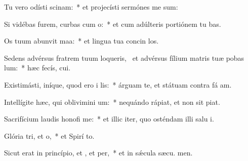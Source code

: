 \item Tu vero odísti scinam:~* et projecísti sermónes me sum:
\item Si vidébas furem, curbas cum o:~* et cum adúlteris portiónem tu bas.
\item Os tuum abunvit maa:~* et lingua tua concin los.
\item Sedens advérsus fratrem tuum loqueris,~\pscross{} et advérsus fílium matris tuæ pobas lum:~* hæc fecís,  cui.
\item Existimásti, iníque, quod ero i lis:~* árguam te, et státuam contra fá am.
\item Intellígite hæc, qui oblivimini um:~* nequándo rápiat, et non sit  piat.
\item Sacrifícium laudis honofi me:~* et illic iter, quo osténdam illi salu i.
\item Glória tri, et o,~* et Spirí to.
\item Sicut erat in princípio, et , et per,~* et in sǽcula sæcu. men.
